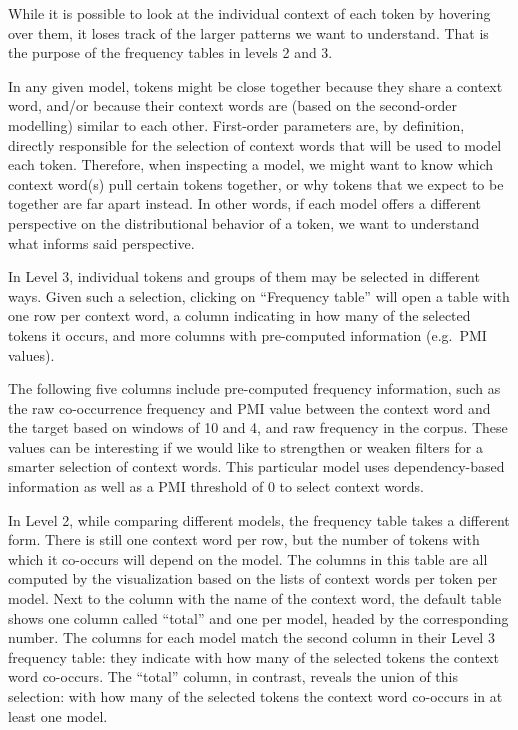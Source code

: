 \documentclass[
]{book}
\begin{document}
While it is possible to look at the individual context of each token by hovering over them, it loses track of the larger patterns we want to understand. That is the purpose of the frequency tables in levels 2 and 3.

In any given model, tokens might be close together because they share a context word, and/or because their context words are (based on the second-order modelling) similar to each other. First-order parameters are, by definition, directly responsible for the selection of context words that will be used to model each token. Therefore, when inspecting a model, we might want to know which context word(s) pull certain tokens together, or why tokens that we expect to be together are far apart instead. In other words, if each model offers a different perspective on the distributional behavior of a token, we want to understand what informs said perspective.

In Level 3, individual tokens and groups of them may be selected in different ways. Given such a selection, clicking on ``Frequency table'' will open a table with one row per context word, a column indicating in how many of the selected tokens it occurs, and more columns with pre-computed information (e.g.~PMI values).

The following five columns include pre-computed frequency information, such as the raw co-occurrence frequency and PMI value between the context word and the target based on windows of 10 and 4, and raw frequency in the corpus.
These values can be interesting if we would like to strengthen or weaken filters for a smarter selection of context words. This particular model uses dependency-based information as well as a PMI threshold of 0 to select context words.

In Level 2, while comparing different models, the frequency table takes a different form. There is still one context word per row, but the number of tokens with which it co-occurs will depend on the model.
The columns in this table are all computed by the visualization based on the lists of context words per token per model. Next to the column with the name of the context word, the default table shows one column called ``total'' and one per model, headed by the corresponding number. The columns for each model match the second column in their Level 3 frequency table: they indicate with how many of the selected tokens the context word co-occurs. The ``total'' column, in contrast, reveals the union of this selection: with how many of the selected tokens the context word co-occurs in at least one model.
\end{document}
